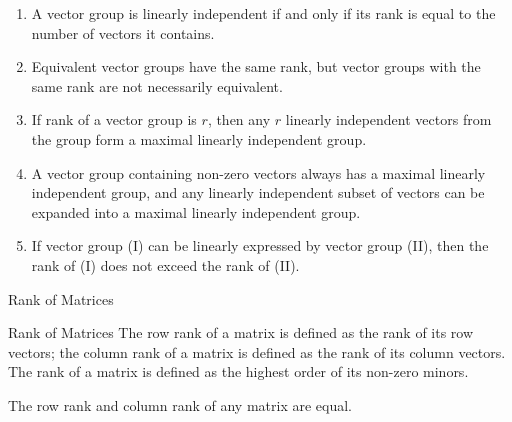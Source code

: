 \documentclass[11pt]{../../TexTemplate/elegantbook} %
\begin{document}
\begin{property}
    \begin{enumerate}
    \item A vector group is linearly independent if and only if its rank is equal to the number of vectors it contains.

    \item Equivalent vector groups have the same rank, but vector groups with the same rank are not necessarily equivalent.

    \item If rank of a vector group is \( r \), 
        then any \( r \) linearly independent vectors from the group form a maximal linearly independent group.

    \item A vector group containing non-zero vectors always has a maximal linearly independent group, 
        and any linearly independent subset of vectors can be expanded into a maximal linearly independent group.

    \item If vector group (I) can be linearly expressed by vector group (II), then the rank of (I) does not exceed the rank of (II).
\end{enumerate}
\end{property}




\begin{leftbarTitle}{Rank of Matrices}\end{leftbarTitle}
\begin{definition}{Rank of Matrices}
    The row rank of a matrix is defined as the rank of its row vectors;
    the column rank of a matrix is defined as the rank of its column vectors. 
    The rank of a matrix is defined as the highest order of its non-zero minors.
\end{definition}

\begin{theorem}
    The row rank and column rank of any matrix are equal.
\end{theorem}
\end{document}
